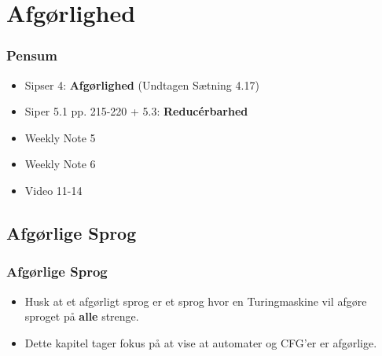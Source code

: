 \section{Afgørlighed}%
\label{sec:Afgørlighed}

\begin{frame}
	\frametitle{Pensum}
	\begin{itemize}
		\item Sipser 4: \textbf{Afgørlighed} (Undtagen Sætning 4.17)
		\item Siper 5.1 pp. 215-220 + 5.3: \textbf{Reducérbarhed}
		\item Weekly Note 5
		\item Weekly Note 6
		\item Video 11-14
	\end{itemize}
\end{frame}

\subsection{Afgørlige Sprog}%
\label{subsec:label}


\begin{frame}
	\frametitle{Afgørlige Sprog}
	\begin{itemize}
		\item Husk at et afgørligt sprog er et sprog hvor en Turingmaskine vil afgøre sproget på \textbf{alle} strenge.
		\item Dette kapitel tager fokus på at vise at automater og CFG'er er afgørlige.
	\end{itemize}
\end{frame}

